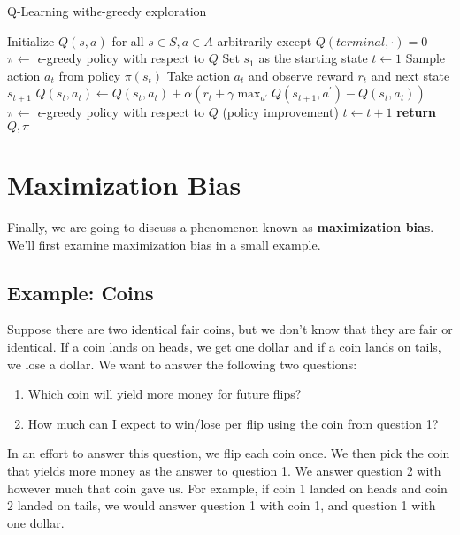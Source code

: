 \documentclass{article}
\theoremstyle{definition}
\theoremstyle{remark}
\begin{document}
\begin{algorithm}
\caption{Q-Learning with$\epsilon$-greedy exploration}\label{alg:qlearn}
\begin{algorithmic}[1]
\State Initialize $Q(s,a)$ for all $s \in S, a \in A$ arbitrarily except $Q(terminal, \cdot) = 0$
\State $\pi \gets $ $\epsilon$-greedy policy with respect to $Q$
\State Set $s_1$ as the starting state
\State $t \gets 1$
\State Sample action $a_t$ from policy $\pi(s_t)$
\State Take action $a_t$ and observe reward $r_t$ and next state $s_{t+1}$
\State $Q(s_t, a_t) \gets Q(s_t, a_t) + \alpha(r_t + \gamma \max_{a^\prime} Q(s_{t+1}, a^\prime) - Q(s_t, a_t))$
\State $\pi \gets $ $\epsilon$-greedy policy with respect to $Q$ (policy improvement)
\State $ t \gets t+1$
\EndLoop
\EndFor
\State \textbf{return} $Q, \pi$
\EndProcedure
\end{algorithmic}
\end{algorithm}

\section{Maximization Bias}

Finally, we are going to discuss a phenomenon known as \textbf{maximization bias}.  We'll first examine maximization bias in a small example.

\subsection{Example: Coins}
Suppose there are two identical fair coins, but we don't know that they are fair or identical.  If a coin lands on heads, we get one dollar and if a coin lands on tails, we lose a dollar.  We want to answer the following two questions:
\begin{enumerate}[noitemsep,partopsep=0pt,topsep=0pt,parsep=0pt]
	\item Which coin will yield more money for future flips?
	\item How much can I expect to win/lose per flip using the coin from question 1?
\end{enumerate}
In an effort to answer this question, we flip each coin once.  We then pick the coin that yields more money as the answer to question 1.  We answer question 2 with however much that coin gave us.  For example, if coin 1 landed on heads and coin 2 landed on tails, we would answer question 1 with coin 1, and question 1 with one dollar.
\end{document}
